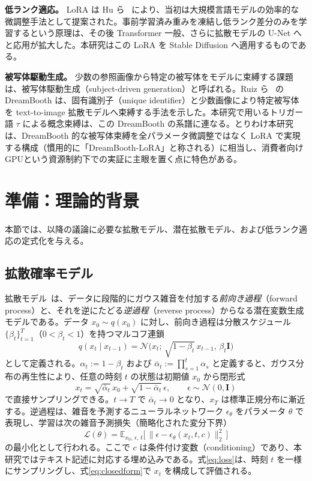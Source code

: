 \documentclass[10pt,twocolumn]{ltjsarticle}
\begin{document}
\textbf{低ランク適応。} LoRA は Hu ら~\cite{hu2022lora} により、当初は大規模言語モデルの効率的な微調整手法として提案された。事前学習済み重みを凍結し低ランク差分のみを学習するという原理は、その後 Transformer 一般、さらに拡散モデルの U-Net へと応用が拡大した。本研究はこの LoRA を Stable Diffusion へ適用するものである。

\textbf{被写体駆動生成。} 少数の参照画像から特定の被写体をモデルに束縛する課題は、被写体駆動生成（subject-driven generation）と呼ばれる。Ruiz ら~\cite{ruiz2023dreambooth} の DreamBooth は、固有識別子（unique identifier）と少数画像により特定被写体を text-to-image 拡散モデルへ束縛する手法を示した。本研究で用いるトリガー語 $\tau$ による概念束縛は、この DreamBooth の系譜に連なる。とりわけ本研究は、DreamBooth 的な被写体束縛を全パラメータ微調整ではなく LoRA で実現する構成（慣用的に「DreamBooth-LoRA」と称される）に相当し、消費者向けGPUという資源制約下での実証に主眼を置く点に特色がある。

\section{準備：理論的背景}
本節では、以降の議論に必要な拡散モデル、潜在拡散モデル、および低ランク適応の定式化を与える。

\subsection{拡散確率モデル}
拡散モデル~\cite{ho2020ddpm}は、データに段階的にガウス雑音を付加する\emph{前向き過程}（forward process）と、それを逆にたどる\emph{逆過程}（reverse process）からなる潜在変数生成モデルである。データ $x_0\sim q(x_0)$ に対し、前向き過程は分散スケジュール $\{\beta_t\}_{t=1}^{T}$（$0<\beta_t<1$）を持つマルコフ連鎖
\begin{equation}
q(x_t\mid x_{t-1}) = \mathcal{N}\!\big(x_t;\,\sqrt{1-\beta_t}\,x_{t-1},\,\beta_t\mathbf{I}\big)
\end{equation}
として定義される。$\alpha_t:=1-\beta_t$ および $\bar\alpha_t:=\prod_{s=1}^{t}\alpha_s$ と定義すると、ガウス分布の再生性により、任意の時刻 $t$ の状態は初期値 $x_0$ から閉形式
\begin{equation}
x_t = \sqrt{\bar\alpha_t}\,x_0 + \sqrt{1-\bar\alpha_t}\,\epsilon,\qquad \epsilon\sim\mathcal{N}(0,\mathbf{I})
\label{eq:closedform}
\end{equation}
で直接サンプリングできる。$t\to T$ で $\bar\alpha_t\to 0$ となり、$x_T$ は標準正規分布に漸近する。逆過程は、雑音を予測するニューラルネットワーク $\epsilon_\theta$ をパラメータ $\theta$ で表現し、学習は次の雑音予測損失（簡略化された変分下界）
\begin{equation}
\mathcal{L}(\theta)=\mathbb{E}_{x_0,\,\epsilon,\,t}\Big[\,\big\lVert\epsilon-\epsilon_\theta(x_t,t,c)\big\rVert_2^2\,\Big]
\label{eq:loss}
\end{equation}
の最小化として行われる。ここで $c$ は条件付け変数（conditioning）であり、本研究ではテキスト記述に対応する埋め込みである。式\eqref{eq:loss}は、時刻 $t$ を一様にサンプリングし、式\eqref{eq:closedform}で $x_t$ を構成して評価される。
\end{document}
